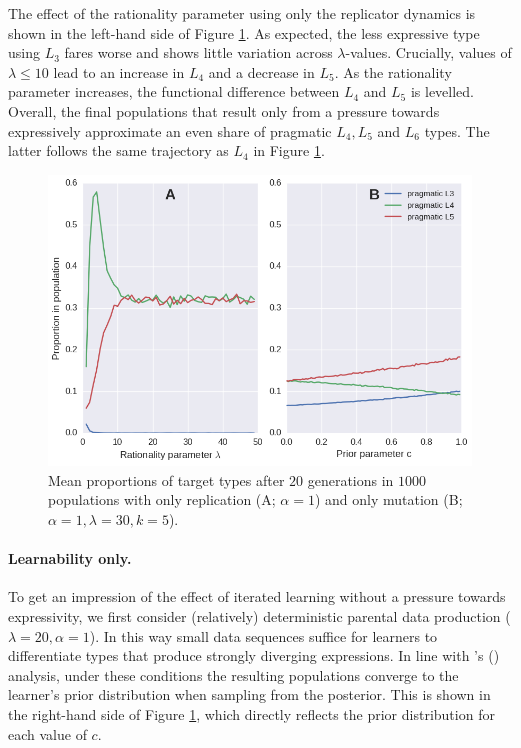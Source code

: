 \documentclass[a4paper]{article}
\newcommand{\citeposs}[2][]{\citeauthor{#2}'s (\citeyear[#1]{#2})}
\begin{document}
The effect of the rationality parameter using only the replicator dynamics is shown in the left-hand side of Figure \ref{fig:either-R-or-M}. As expected, the less expressive type using $L_3$ fares worse and shows little variation across $\lambda$-values. Crucially, values of $\lambda \leq 10$ lead to an increase in $L_4$ and a decrease in $L_5$. As the rationality parameter increases, the functional difference between $L_4$ and $L_5$ is levelled. Overall, the final populations that result only from a pressure towards expressively approximate an even share of pragmatic $L_4, L_5$ and $L_6$ types. The latter follows the same trajectory as $L_4$ in Figure \ref{fig:either-R-or-M}.  

\begin{figure}
\centering
\includegraphics[scale=.5]{./only-R-or-M}
\caption{Mean proportions of target types after $20$ generations in $1000$ populations with only replication (A; $\alpha = 1$) and only mutation (B; $\alpha =1, \lambda = 30, k = 5$).}
\label{fig:either-R-or-M}
\end{figure}

\paragraph{Learnability only.} To get an impression of the effect of iterated learning without a pressure towards expressivity, we first consider (relatively) deterministic parental data production ($\lambda = 20, \alpha = 1$). In this way small data sequences suffice for learners to differentiate types that produce strongly diverging expressions. In line with \citeposs{griffiths+kalish:2007} analysis, under these conditions the resulting populations converge to the learner's prior distribution when sampling from the posterior. This is shown in the right-hand side of Figure \ref{fig:either-R-or-M}, which directly reflects the prior distribution for each value of $c$.
\end{document}
